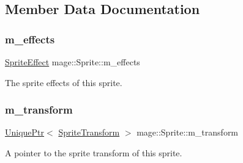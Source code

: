\subsection{Member Data Documentation}
\hypertarget{classmage_1_1_sprite_a87a51b2b131c28bad75768d14defa3c1}{}\label{classmage_1_1_sprite_a87a51b2b131c28bad75768d14defa3c1} 
\subsubsection{\texorpdfstring{m\+\_\+effects}{m\_effects}}
{\footnotesize\ttfamily \hyperlink{namespacemage_a9cfe18123066ba4236f548f9de75d881}{Sprite\+Effect} mage\+::\+Sprite\+::m\+\_\+effects\hspace{0.3cm}{\ttfamily [private]}}

The sprite effects of this sprite. \hypertarget{classmage_1_1_sprite_ae9907dd9d43fe2ce025bbc86b06dc7a3}{}\label{classmage_1_1_sprite_ae9907dd9d43fe2ce025bbc86b06dc7a3} 
\subsubsection{\texorpdfstring{m\+\_\+transform}{m\_transform}}
{\footnotesize\ttfamily \hyperlink{namespacemage_a3316d7143a973e37adf1110f2e80ca31}{Unique\+Ptr}$<$ \hyperlink{classmage_1_1_sprite_transform}{Sprite\+Transform} $>$ mage\+::\+Sprite\+::m\+\_\+transform\hspace{0.3cm}{\ttfamily [private]}}

A pointer to the sprite transform of this sprite. 